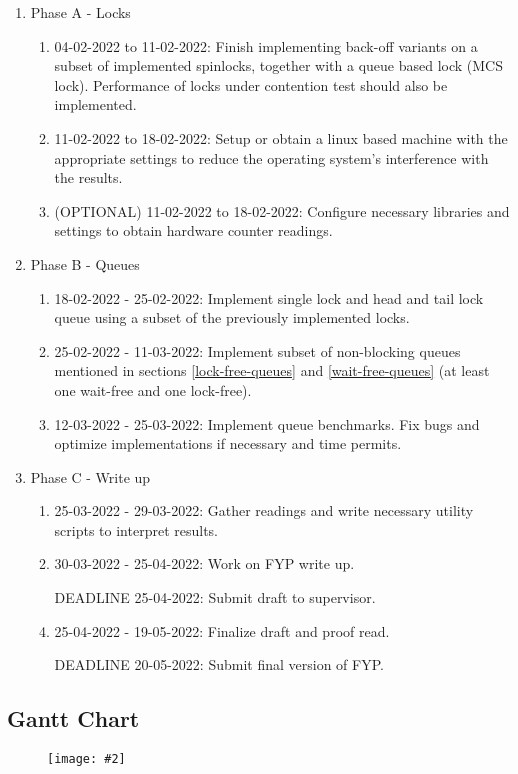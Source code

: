 \documentclass[a4paper, 12pt, titlepage]{article}
\newcommand{\image}[4]{
  \begin{figure}[H]
    \centerline{\texttt{[image: \#2]}}
    \captionof{figure}{#3}
    \label{fig: #4}
  \end{figure}
}
\begin{document}
\begin{singlespace}
\begin{enumerate}
  \item Phase A - Locks
  \begin{enumerate}
    \item 04-02-2022 to 11-02-2022: Finish implementing back-off variants on a subset of implemented spinlocks, together with a queue based lock (MCS lock). Performance of locks under contention test should also be implemented.
    \item 11-02-2022 to 18-02-2022: Setup or obtain a linux based machine with the appropriate settings to reduce the operating system's interference with the results.
  \item (OPTIONAL) 11-02-2022 to 18-02-2022: Configure necessary libraries and settings to obtain hardware counter readings.
  \end{enumerate}
  \item Phase B - Queues
  \begin{enumerate}
    \item 18-02-2022 - 25-02-2022: Implement single lock and head and tail lock queue using a subset of the previously implemented locks.
    \item 25-02-2022 - 11-03-2022: Implement subset of non-blocking queues mentioned in sections \ref{lock-free-queues} and \ref{wait-free-queues} (at least one wait-free and one lock-free).
    \item 12-03-2022 - 25-03-2022: Implement queue benchmarks. Fix bugs and optimize implementations if necessary and time permits.
  \end{enumerate}
  \item Phase C - Write up
  \begin{enumerate}
    \item 25-03-2022 - 29-03-2022: Gather readings and write necessary utility scripts to interpret results.
    \item 30-03-2022 - 25-04-2022: Work on FYP write up.
    \item [DEADLINE]25-04-2022: Submit draft to supervisor.
    \item 25-04-2022 - 19-05-2022: Finalize draft and proof read.
  \item [DEADLINE]20-05-2022: Submit final version of FYP.
  \end{enumerate}
\end{enumerate}
\pagebreak
\subsection{Gantt Chart}
\image{0.8}{gantt_chart.png}{Gantt chart}{gantt}
\pagebreak
\appendix


\end{singlespace}
\end{document}

